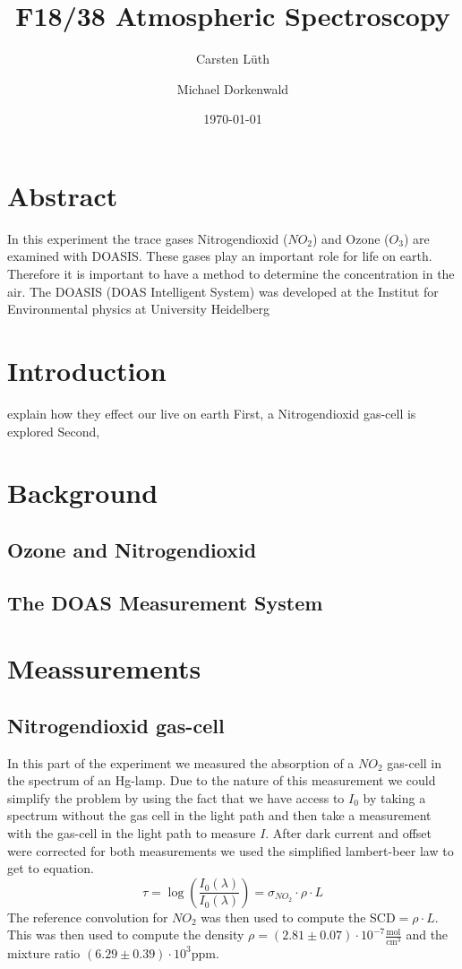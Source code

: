 \documentclass[12pt, english]{scrartcl} %
\title{F18/38 Atmospheric Spectroscopy}
\author{Carsten L{\"u}th \and Michael Dorkenwald}
\date{\today}
\begin{document}
\maketitle

\begin{multicols}{2}


\section{Abstract}
In this experiment the trace gases Nitrogendioxid ($NO_2$) and Ozone ($O_3$) are examined with DOASIS. These gases play an important role for life on earth. Therefore it is important to have a method to determine the concentration in the air. The DOASIS (DOAS Intelligent System) was developed at the Institut for Environmental physics at University Heidelberg
\section{Introduction}

explain how they effect our live on earth 
First, a Nitrogendioxid gas-cell is explored 
Second, 

\section{Background}

\subsection{Ozone and Nitrogendioxid}

\subsection{The DOAS Measurement System}

\newpage
\section{Meassurements}
\subsection{Nitrogendioxid gas-cell}
In this part of the experiment we measured the absorption of a $NO_2$ gas-cell in the spectrum of an Hg-lamp. Due to the nature of this measurement we could simplify the problem by using the fact that we have access to $I_0$ by taking a spectrum without the gas cell in the light path and then take a measurement with the gas-cell in the light path to measure $I$. After dark current and offset were corrected for both measurements we used the simplified lambert-beer law to get to equation.
\begin{equation}
\tau = \log(\frac{I_0(\lambda)}{I_0(\lambda)})= \sigma_{NO_2} \cdot \rho \cdot L
\end{equation}
The reference convolution for $NO_2$ was then used to compute the SCD$= \rho \cdot L$. This was then used to compute the density $\rho = (2.81 \pm 0.07 ) \cdot 10^{-7} \frac{\text{mol}}{\text{cm}^3}$ and the mixture ratio $(6.29 \pm 0.39) \cdot 10^3 \text{ppm}$.

\end{multicols}
\end{document}
